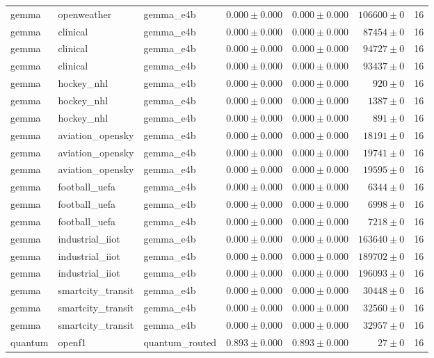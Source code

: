 \begin{table}[htbp]
\begin{tabular}{l l l r r r r}
gemma & openweather & gemma\_e4b & $0.000\pm0.000$ & $0.000\pm0.000$ & $106600\pm0$ & 16 \\
gemma & clinical & gemma\_e4b & $0.000\pm0.000$ & $0.000\pm0.000$ & $87454\pm0$ & 16 \\
gemma & clinical & gemma\_e4b & $0.000\pm0.000$ & $0.000\pm0.000$ & $94727\pm0$ & 16 \\
gemma & clinical & gemma\_e4b & $0.000\pm0.000$ & $0.000\pm0.000$ & $93437\pm0$ & 16 \\
gemma & hockey\_nhl & gemma\_e4b & $0.000\pm0.000$ & $0.000\pm0.000$ & $920\pm0$ & 16 \\
gemma & hockey\_nhl & gemma\_e4b & $0.000\pm0.000$ & $0.000\pm0.000$ & $1387\pm0$ & 16 \\
gemma & hockey\_nhl & gemma\_e4b & $0.000\pm0.000$ & $0.000\pm0.000$ & $891\pm0$ & 16 \\
gemma & aviation\_opensky & gemma\_e4b & $0.000\pm0.000$ & $0.000\pm0.000$ & $18191\pm0$ & 16 \\
gemma & aviation\_opensky & gemma\_e4b & $0.000\pm0.000$ & $0.000\pm0.000$ & $19741\pm0$ & 16 \\
gemma & aviation\_opensky & gemma\_e4b & $0.000\pm0.000$ & $0.000\pm0.000$ & $19595\pm0$ & 16 \\
gemma & football\_uefa & gemma\_e4b & $0.000\pm0.000$ & $0.000\pm0.000$ & $6344\pm0$ & 16 \\
gemma & football\_uefa & gemma\_e4b & $0.000\pm0.000$ & $0.000\pm0.000$ & $6998\pm0$ & 16 \\
gemma & football\_uefa & gemma\_e4b & $0.000\pm0.000$ & $0.000\pm0.000$ & $7218\pm0$ & 16 \\
gemma & industrial\_iiot & gemma\_e4b & $0.000\pm0.000$ & $0.000\pm0.000$ & $163640\pm0$ & 16 \\
gemma & industrial\_iiot & gemma\_e4b & $0.000\pm0.000$ & $0.000\pm0.000$ & $189702\pm0$ & 16 \\
gemma & industrial\_iiot & gemma\_e4b & $0.000\pm0.000$ & $0.000\pm0.000$ & $196093\pm0$ & 16 \\
gemma & smartcity\_transit & gemma\_e4b & $0.000\pm0.000$ & $0.000\pm0.000$ & $30448\pm0$ & 16 \\
gemma & smartcity\_transit & gemma\_e4b & $0.000\pm0.000$ & $0.000\pm0.000$ & $32560\pm0$ & 16 \\
gemma & smartcity\_transit & gemma\_e4b & $0.000\pm0.000$ & $0.000\pm0.000$ & $32957\pm0$ & 16 \\
quantum & openf1 & quantum\_routed & $0.893\pm0.000$ & $0.893\pm0.000$ & $27\pm0$ & 16 \\

\end{tabular}
\end{table}
